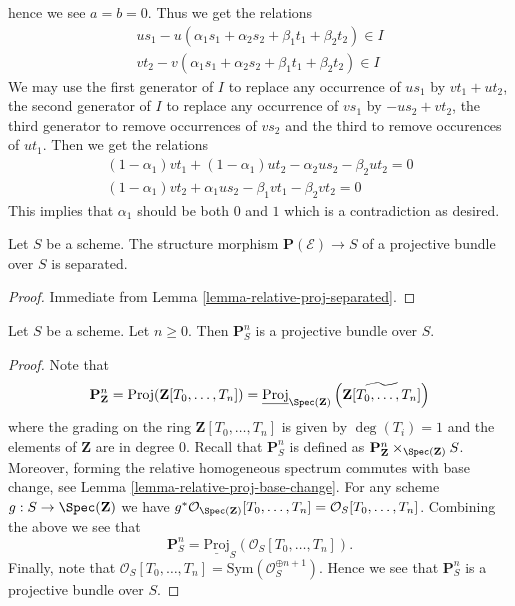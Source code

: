 \begin{example}
hence we see $a = b = 0$. Thus we get the relations
$$
\begin{matrix}
us_1 - u(\alpha_1s_1 + \alpha_2s_2 + \beta_1t_1 + \beta_2t_2)
\in I \\
vt_2 - v(\alpha_1s_1 + \alpha_2s_2 + \beta_1t_1 + \beta_2t_2)
\in I
\end{matrix}
$$
We may use the first generator of $I$ to replace any occurrence of
$us_1$ by $vt_1 + ut_2$, the second generator of $I$ to replace any
occurrence of $vs_1$ by $-us_2 + vt_2$, the third generator
to remove occurrences of $vs_2$ and the third to remove occurences
of $ut_1$. Then we get the relations
$$
\begin{matrix}
(1 - \alpha_1)vt_1 + (1 - \alpha_1)ut_2 - \alpha_2us_2 - \beta_2ut_2 = 0 \\
(1 - \alpha_1)vt_2 + \alpha_1us_2 - \beta_1vt_1 - \beta_2vt_2 = 0
\end{matrix}
$$
This implies that $\alpha_1$ should be both $0$ and $1$ which is
a contradiction as desired.
\end{example}


\begin{lemma}
\label{lemma-projective-bundle-separated}
Let $S$ be a scheme.
The structure morphism $\mathbf{P}(\mathcal{E}) \to S$ of a
projective bundle over $S$ is separated.
\end{lemma}

\begin{proof}
Immediate from Lemma \ref{lemma-relative-proj-separated}.
\end{proof}

\begin{lemma}
\label{lemma-projective-space-bundle}
Let $S$ be a scheme. Let $n \geq 0$. Then
$\mathbf{P}^n_S$ is a projective bundle over $S$.
\end{lemma}

\begin{proof}
Note that
$$
\mathbf{P}^n_{\mathbf{Z}} =
\text{Proj}(\mathbf{Z}[T_0, \ldots, T_n]) =
\underline{\text{Proj}}_{\Spec(\mathbf{Z})}
\left(\widetilde{\mathbf{Z}[T_0, \ldots, T_n]}\right)
$$
where the grading on the ring $\mathbf{Z}[T_0, \ldots, T_n]$ is given by
$\deg(T_i) = 1$ and the elements of $\mathbf{Z}$ are in degree $0$.
Recall that $\mathbf{P}^n_S$ is defined as
$\mathbf{P}^n_{\mathbf{Z}} \times_{\Spec(\mathbf{Z})} S$.
Moreover, forming the relative homogeneous spectrum commutes with base change,
see Lemma \ref{lemma-relative-proj-base-change}.
For any scheme $g : S \to \Spec(\mathbf{Z})$ we have
$g^*\mathcal{O}_{\Spec(\mathbf{Z})}[T_0, \ldots, T_n]
= \mathcal{O}_S[T_0, \ldots, T_n]$.
Combining the above we see that
$$
\mathbf{P}^n_S = \underline{\text{Proj}}_S(\mathcal{O}_S[T_0, \ldots, T_n]).
$$
Finally, note that
$\mathcal{O}_S[T_0, \ldots, T_n] = \text{Sym}(\mathcal{O}_S^{\oplus n + 1})$.
Hence we see that $\mathbf{P}^n_S$ is a projective bundle over $S$.
\end{proof}



